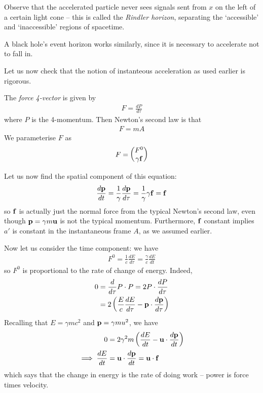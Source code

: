 \documentclass{../template/note}
\begin{document}
    Observe that the accelerated particle never sees signals sent from \(x\) on the left of a certain light cone -- this is called the \emph{Rindler horizon}, separating the `accessible' and `inaccessible' regions of spacetime.

    \begin{remark*}
        A black hole's event horizon works similarly, since it is necessary to accelerate not to fall in.
    \end{remark*}
    
    Let us now check that the notion of instanteous acceleration as used earlier is rigorous.

    \begin{definition}
        The \emph{force 4-vector} is given by
        \begin{align*}
            F = \frac{dP}{d \tau}
        \end{align*}
        where \(P\) is the 4-momentum. Then Newton's second law is that
        \begin{align*}
            F = mA
        \end{align*}
        We parameterise \(F\) as
        \begin{align*}
            F = \begin{pmatrix}
                F^0 \\
                \gamma \V f \\
            \end{pmatrix}
        \end{align*}
    \end{definition}
    Let us now find the spatial component of this equation:
    \begin{align*}
        \frac{d\V p}{dt} = \frac 1 \gamma \frac{d\V p}{d\tau} = \frac{1}{\gamma} \gamma \V f = \V f
    \end{align*}
    so \(\V f\) is actually just the normal force from the typical Newton's second law, even though \(\V p = \gamma m \V u\) is not the typical momentum. Furthermore, \(\V f\) constant implies \(a'\) is constant in the instantaneous frame \(A\), as we assumed earlier.

    Now let us consider the time component: we have
    \begin{align*}
        F^0 = \frac 1 c \frac{dE}{d\tau} = \frac{\gamma}c \frac{dE}{dt}
    \end{align*}
    so \(F^0\) is proportional to the rate of change of energy. Indeed,
    \begin{align*}
        0 &= \frac{d}{d\tau} P \cdot P = 2P \cdot \frac{dP}{d\tau} \\
        &= 2\left(\frac E c \frac{dE}{d\tau} - \V p \cdot \frac{d\V p}{d\tau}\right)
    \end{align*}
    Recalling that \(E=\gamma mc^2\) and \(\V p = \gamma m u^2\), we have
    \begin{align*}
        0 &= 2\gamma^2 m \left(\frac{dE}{dt}-\V u \cdot \frac{d\V p}{dt}\right) \\
        \implies \frac{dE}{dt} &= \V u \cdot \frac{d\V p}{dt} = \V u \cdot \V f
    \end{align*}
    which says that the change in energy is the rate of doing work -- power is force times velocity.
    
\end{document}
